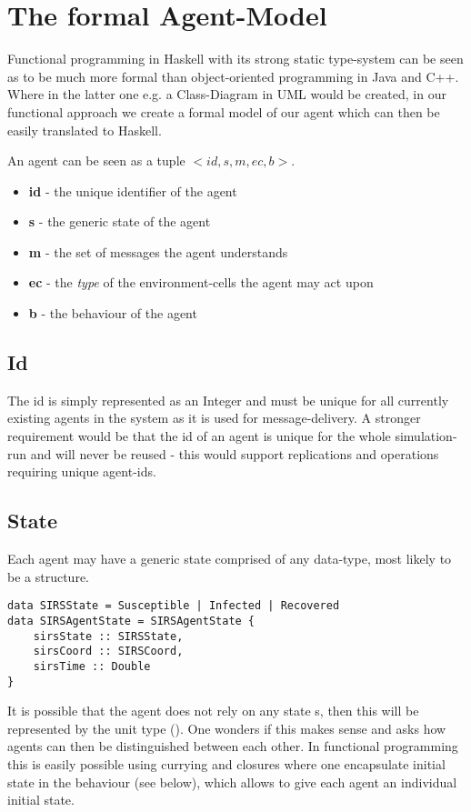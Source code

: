 \section{The formal Agent-Model}
Functional programming in Haskell with its strong static type-system can be seen as to be much more formal than object-oriented programming in Java and C++. Where in the latter one e.g. a Class-Diagram in UML would be created, in our functional approach we create a formal model of our agent which can then be easily translated to Haskell.

An agent can be seen as a tuple $<id, s, m, ec, b>$.
\begin{itemize}
	\item \textbf{id} - the unique identifier of the agent
	\item \textbf{s} - the generic state of the agent
	\item \textbf{m} - the set of messages the agent understands
	\item \textbf{ec} - the \textit{type} of the environment-cells the agent may act upon
	\item \textbf{b} - the behaviour of the agent
\end{itemize}

\subsection{Id}
The id is simply represented as an Integer and must be unique for all currently existing agents in the system as it is used for message-delivery. A stronger requirement would be that the id of an agent is unique for the whole simulation-run and will never be reused - this would support replications and operations requiring unique agent-ids.

\subsection{State}
Each agent may have a generic state comprised of any data-type, most likely to be a structure.
\begin{lstlisting}[]
data SIRSState = Susceptible | Infected | Recovered
data SIRSAgentState = SIRSAgentState {
    sirsState :: SIRSState,
    sirsCoord :: SIRSCoord,
    sirsTime :: Double
} 
\end{lstlisting}

It is possible that the agent does not rely on any state s, then this will be represented by the unit type (). One wonders if this makes sense and asks how agents can then be distinguished between each other. In functional programming this is easily possible using currying and closures where one encapsulate initial state in the behaviour (see below), which allows to give each agent an individual initial state.

